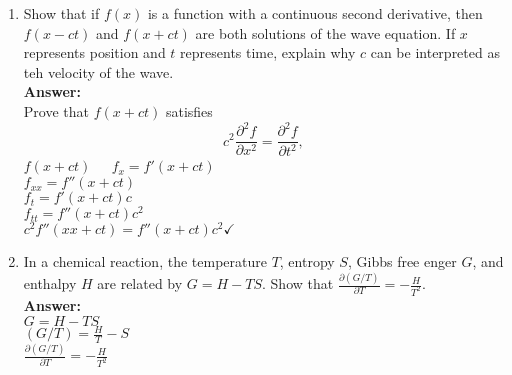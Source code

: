 \documentclass[11pt]{article}
\begin{document}
\begin{enumerate}
   \\
   $f_{nt}= \sin (n \pi x)(- \pi c \sin (n \pi ct)-n \pi^2 c^2 t \cos (n \pi ct))- n \pi c \sin (n \pi c t)(\pi x \cos (n \pi x)) $
   \\
   We want to show that $c^2f_{nx}=f_{nt}$
   \\
   $c^2(-n\pi \cos (n \pi x)(- \pi c t \sin (n \pi c t))+ \cos (n \pi c t)(\pi \cos (n \pi x)- \pi^2 xn \sin (n \pi x)))=(\sin (n \pi x)(- \pi c \sin (n \pi ct)-n \pi^2 c^2 t \cos (n \pi ct))- n \pi c \sin (n \pi c t)(\pi x \cos (n \pi x)))$
   \\
   \\
   $-c^2n\pi \cos (n \pi x)(- \pi c t \sin (n \pi c t))+ c^2 \cos (n \pi c t)(\pi \cos (n \pi x)- c^2 \pi^2 xn \sin (n \pi x))=\sin (n \pi x)(- \pi c \sin (n \pi ct)-n \pi^2 c^2 t \cos (n \pi ct))- n \pi c \sin (n \pi c t)(\pi x \cos (n \pi x))$
   \\
   This can be reduced to equal each other.
   
    
    \item Show that if $f(x)$ is a function with a continuous second derivative, then $f(x-ct)$ and $f(x+ct)$ are both solutions of the wave equation.  If $x$ represents position and $t$ represents time, explain why $c$ can be interpreted as teh velocity of the wave.  
    \\
    \textbf{Answer:}
    \\
    Prove that $f(x+ct)$ satisfies 
     \[ c^2 \frac{\partial^2 f}{\partial x^2} = \frac{\partial^2 f}{\partial t^2},  \]
     $f(x+ct) \; \; \; \;$ $f_x=f'(x+ct)$
     \\
     $f_{xx}=f''(x+ct)$
     \\
     $f_t=f'(x+ct)c$
     \\
     $f_{tt}=f''(x+ct)c^2$
     \\
     $c^2f''(xx+ct)=f''(x+ct)c^2 \checkmark$
    
    
    \item In a chemical reaction, the temperature $T$, entropy $S$, Gibbs free enger $G$, and enthalpy $H$ are related by $G = H - TS$.  Show that $\frac{\partial(G/T)}{\partial T} =  - \frac{H}{T^2}$.
    \\
    \textbf{Answer:}
    \\
    $G=H-TS$
    \\
    $(G/T)=\frac{H}{T}-S$
    \\
    $\frac{\partial(G/T)}{\partial T}=-\frac{H}{T^2}$
    

\end{enumerate}
\end{document}
